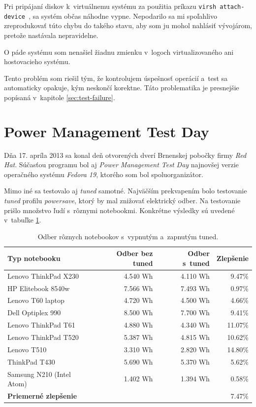 Pri pripájaní diskov k~virtuálnemu systému za použitia príkazu \texttt{virsh
attach-device }, sa systém občas náhodne vypne. Nepodarilo sa mi spoľahlivo
zreprodukovať túto chybu do takého stavu, aby som ju mohol nahlásiť vývojárom,
pretože nastávala nepravidelne. 

O páde systému som nenašiel žiadnu zmienku v~logoch virtualizovaného ani
hostovacieho systému. 

Tento problém som riešil tým, že kontrolujem úspešnosť operácií a~test sa
automaticky opakuje, kým neskončí korektne. Táto problematika je presnejšie
popísaná v~kapitole \ref{sec:test-failure}.

%
%

\section{Power Management Test Day}

Dňa 17. apríla 2013 sa konal deň otvorených dverí Brnenskej pobočky firmy
\emph{Red Hat}. Súčasťou programu bol aj \emph{Power Management Test Day}
najnovšej verzie operačného systému \emph{Fedora 19}, ktorého som bol
spoluorganizátor. 

Mimo iné sa testovalo aj \emph{tuned} samotné. Najväčším prekvapením bolo
testovanie \emph{tuned} profilu \emph{powersave}, ktorý by mal znižovať
elektrický odber. Na testovanie prišlo množstvo ľudí s~rôznymi notebookmi.
Konkrétne výsledky sú uvedené v~tabuľke \ref{tab:testday-results}.

\begin{table}[H]
\begin{center}
\begin{tabular}{|l|r|r|r|}
    \hline
    \textbf{Typ notebooku} & \textbf{Odber bez tuned} & \textbf{Odber s~tuned} & \textbf{Zlepšenie} \\
    \hline
    Lenovo ThinkPad X230        & 4.540 Wh & 4.110 Wh & 9.47\% \\
    HP Elitebook 8540w          & 7.566 Wh & 7.493 Wh & 0.97\% \\
    Lenovo T60 laptop           & 4.720 Wh & 4.500 Wh & 4.66\% \\
    Dell Optiplex 990           & 8.500 Wh & 7.700 Wh & 9.41\% \\
    Lenovo ThinkPad T61         & 4.880 Wh & 4.340 Wh & 11.07\% \\
    Lenovo ThinkPad T520        & 5.387 Wh & 4.815 Wh & 10.62\% \\
    Lenovo T510                 & 3.310 Wh & 2.820 Wh & 14.80\% \\
    ThinkPad T430               & 5.690 Wh & 5.370 Wh & 5.62\% \\
    Samsung N210 (Intel Atom)   & 1.402 Wh & 1.394 Wh & 0.58\% \\
    \hline
    \textbf{Priemerné zlepšenie} & \multicolumn{3}{|r|}{7.47\%} \\
    \hline
\end{tabular}
\caption{Odber rôznych notebookov s~vypnutým a~zapnutým tuned.}
\label{tab:testday-results}
\end{center}
\end{table}

